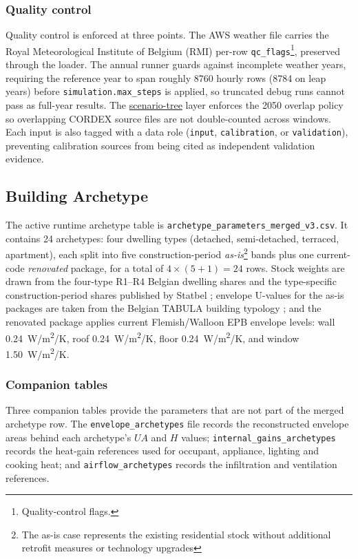 \subsubsection*{Quality control}
Quality control is enforced at three points. The AWS weather file carries the Royal Meteorological Institute of Belgium (RMI) per-row \texttt{qc\_flags}\footnote{Quality-control flags.}, preserved through the loader. The annual runner guards against incomplete weather years, requiring the reference year to span roughly \num{8760} hourly rows (\num{8784} on leap years) before \texttt{simulation.max\_steps} is applied, so truncated debug runs cannot pass as full-year results. The \hyperref[sec:scenarioTreeSystem]{scenario-tree} layer enforces the 2050 overlap policy so overlapping CORDEX source files are not double-counted across windows. Each input is also tagged with a data role (\texttt{input}, \texttt{calibration}, or \texttt{validation}), preventing calibration sources from being cited as independent validation evidence.


\subsection{Building Archetype}
\label{sec:input_building_archetype}
 
The active runtime archetype table is \texttt{archetype\_parameters\_merged\_v3.csv}. It contains \num{24} archetypes: four dwelling types (detached, semi-detached, terraced, apartment), each split into five construction-period \emph{as-is}\footnote{The as-is case represents the existing residential stock without additional retrofit measures or technology upgrades} bands plus one current-code \emph{renovated} package, for a total of $4 \times (5+1) = 24$ rows. Stock weights are drawn from the four-type R1--R4 Belgian dwelling shares and the type-specific construction-period shares published by Statbel \cite{Statbel2024Census}; envelope U-values for the as-is packages are taken from the Belgian TABULA building typology \cite{Loga2016TABULA,Cyx2011TABULABE}; and the renovated package applies current Flemish/Walloon EPB envelope levels: wall \SI{0.24}{W/m^2/K}, roof \SI{0.24}{W/m^2/K}, floor \SI{0.24}{W/m^2/K}, and window \SI{1.50}{W/m^2/K}.

\subsubsection*{Companion tables}
Three companion tables provide the parameters that are not part of the merged archetype row. The \texttt{envelope\_archetypes} file records the reconstructed envelope areas behind each archetype's $UA$ and $H$ values; \texttt{internal\_gains\_archetypes} records the heat-gain references used for occupant, appliance, lighting and cooking heat; and \texttt{airflow\_archetypes} records the infiltration and ventilation references.


